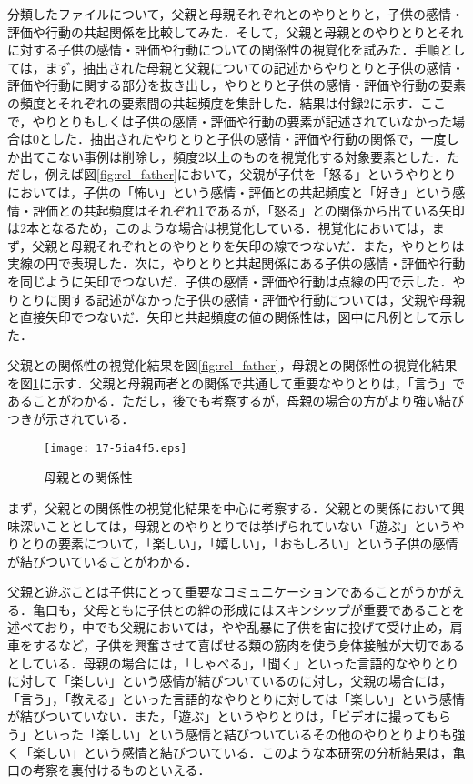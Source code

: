 \documentclass[japanese]{jnlp_1.4}
\begin{document}
分類したファイルについて，父親と母親それぞれとのやりとりと，子供の感情・評価や行動の共起関係を比較してみた．そして，父親と母親とのやりとりとそれに対する子供の感情・評価や行動についての関係性の視覚化を試みた．手順としては，まず，抽出された母親と父親についての記述からやりとりと子供の感情・評価や行動に関する部分を抜き出し，やりとりと子供の感情・評価や行動の要素の頻度とそれぞれの要素間の共起頻度を集計した．結果は付録2に示す．ここで，やりとりもしくは子供の感情・評価や行動の要素が記述されていなかった場合は0とした．抽出されたやりとりと子供の感情・評価や行動の関係で，一度しか出てこない事例は削除し，頻度2以上のものを視覚化する対象要素とした．ただし，例えば図\ref{fig:rel_father}において，父親が子供を「怒る」というやりとりにおいては，子供の「怖い」という感情・評価との共起頻度と「好き」という感情・評価との共起頻度はそれぞれ1であるが，「怒る」との関係から出ている矢印は2本となるため，このような場合は視覚化している．視覚化においては，まず，父親と母親それぞれとのやりとりを矢印の線でつないだ．また，やりとりは実線の円で表現した．次に，やりとりと共起関係にある子供の感情・評価や行動を同じように矢印でつないだ．子供の感情・評価や行動は点線の円で示した．やりとりに関する記述がなかった子供の感情・評価や行動については，父親や母親と直接矢印でつないだ．矢印と共起頻度の値の関係性は，図中に凡例として示した．

父親との関係性の視覚化結果を図\ref{fig:rel_father}，母親との関係性の視覚化結果を図\ref{fig:rel_mother}に示す．父親と母親両者との関係で共通して重要なやりとりは，「言う」であることがわかる．ただし，後でも考察するが，母親の場合の方がより強い結びつきが示されている．

\begin{figure}[t]
\begin{center}
\texttt{[image: 17-5ia4f5.eps]}
\caption{母親との関係性}
\label{fig:rel_mother}
\end{center}
\end{figure}

まず，父親との関係性の視覚化結果を中心に考察する．父親との関係において興味深いこととしては，母親とのやりとりでは挙げられていない「遊ぶ」というやりとりの要素について，「楽しい」，「嬉しい」，「おもしろい」という子供の感情が結びついていることがわかる．

父親と遊ぶことは子供にとって重要なコミュニケーションであることがうかがえる．亀口\cite{Bk_Kam}も，父母ともに子供との絆の形成にはスキンシップが重要であることを述べており，中でも父親においては，やや乱暴に子供を宙に投げて受け止め，肩車をするなど，子供を興奮させて喜ばせる類の筋肉を使う身体接触が大切であるとしている．母親の場合には，「しゃべる」，「聞く」といった言語的なやりとりに対して「楽しい」という感情が結びついているのに対し，父親の場合には，「言う」，「教える」といった言語的なやりとりに対しては「楽しい」という感情が結びついていない．また，「遊ぶ」というやりとりは，「ビデオに撮ってもらう」といった「楽しい」という感情と結びついているその他のやりとりよりも強く「楽しい」という感情と結びついている．このような本研究の分析結果は，亀口の考察を裏付けるものといえる．
\end{document}
